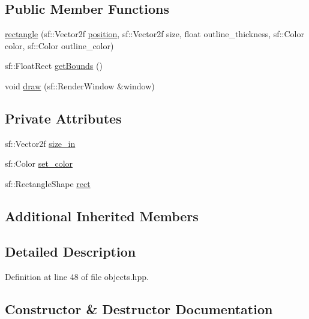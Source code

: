 \subsection*{Public Member Functions}
\begin{DoxyCompactItemize}
\item 
\hyperlink{classrectangle_a455f57024598d3c84906766bc083a104}{rectangle} (sf\+::\+Vector2f \hyperlink{classfigure_a2196c51490b69027860fdb015913de19}{position}, sf\+::\+Vector2f size, float outline\+\_\+thickness, sf\+::\+Color color, sf\+::\+Color outline\+\_\+color)
\item 
sf\+::\+Float\+Rect \hyperlink{classrectangle_a827e05afcb275c3e6fe29fc80337d8cc}{get\+Bounds} ()
\item 
void \hyperlink{classrectangle_aac9bb03014c071fdf932f6cfa3f34f55}{draw} (sf\+::\+Render\+Window \&window)
\end{DoxyCompactItemize}
\subsection*{Private Attributes}
\begin{DoxyCompactItemize}
\item 
sf\+::\+Vector2f \hyperlink{classrectangle_ae2c7b7085f2e7778bc97cec8816360aa}{size\+\_\+in}
\item 
sf\+::\+Color \hyperlink{classrectangle_aad94646844fb2682cc972f734889c694}{set\+\_\+color}
\item 
sf\+::\+Rectangle\+Shape \hyperlink{classrectangle_a22e5d579d5cec330a86d838e6c6e5602}{rect}
\end{DoxyCompactItemize}
\subsection*{Additional Inherited Members}


\subsection{Detailed Description}


Definition at line 48 of file objects.\+hpp.



\subsection{Constructor \& Destructor Documentation}
\mbox{\label{classrectangle_a455f57024598d3c84906766bc083a104}} 
